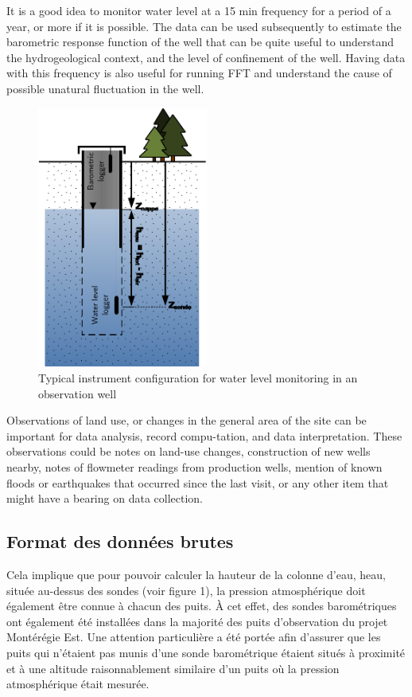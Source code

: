\documentclass[12pt, letterpaper, fleqn]{report}
\begin{document}
It is a good idea to monitor water level at a 15 min frequency for a period of a year, or more if it is possible. The data can be used subsequently to estimate the barometric response function of the well that can be quite useful to understand the hydrogeological context, and the level of confinement of the well. Having data with this frequency is also useful for running FFT and understand the cause of possible unatural fluctuation in the well.

\begin{figure}[h!]
\centering
\includegraphics[width=0.5\textwidth]{img/ObsWell}
\caption[Typical instrument configuration for water level monitoring in an observation well]{Typical instrument configuration for water level monitoring in an observation well}
\label{fig:obswell_config}
\end{figure}

Observations of land use, or changes in the general area of the site can be important for data analysis, record compu-tation, and data interpretation. These observations could be notes on land-use changes, construction of new wells nearby, notes of flowmeter readings from production wells, mention of known floods or earthquakes that occurred since the last visit, or any other item that might have a bearing on data collection.


\subsection{Format des données brutes}

Cela implique que pour pouvoir calculer la hauteur de la colonne d'eau, heau, située au-dessus des sondes (voir figure 1), la pression atmosphérique doit également être connue à chacun des puits. À cet effet, des sondes barométriques ont également été installées dans la majorité des puits d'observation du projet Montérégie Est. Une attention particulière a été portée afin d'assurer que les puits qui n'étaient pas munis d'une sonde barométrique étaient situés à proximité et à une altitude raisonnablement similaire d'un puits où la pression atmosphérique était mesurée.
\end{document}
